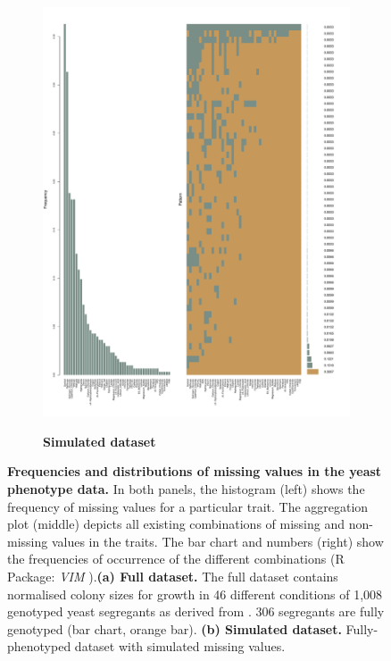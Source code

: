 \begin{figure}[!h]
\begin{subfigure}[b]{0.48\textwidth}
	\end{subfigure}
	~
	\begin{subfigure}[b]{0.48\textwidth}
		\center
	\includegraphics[trim = 0mm 0mm 20mm 2mm, clip, scale=0.2]{Chapter1/Figures/20170124_missing_data_pattern_simulated.pdf}\\
	\caption{\textbf{Simulated  dataset}}
 		\label{fig:missingness-sample}
	\end{subfigure}
	\caption{\textbf{Frequencies and distributions of missing values in the yeast phenotype data.} In both panels, the histogram (left) shows the frequency of missing values for a particular trait. The aggregation plot (middle) depicts all existing combinations of missing and non-missing values in the traits. The bar chart and numbers (right) show the frequencies of occurrence of the different combinations (R Package: \emph{VIM} \citep{Templ2012}).\textbf{(a) Full dataset. } The full dataset contains normalised colony sizes for growth in 46 different conditions of 1,008 genotyped yeast segregants as derived from \citep{Bloom2013}. 306 segregants are fully genotyped (bar chart, orange bar).  \textbf{(b) Simulated dataset. } Fully-phenotyped dataset with simulated missing values. }
 	\label{fig:missingness}
\end{figure}

